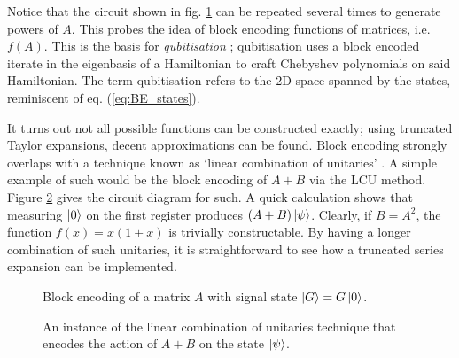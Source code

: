 \documentclass{article}
\begin{document}
Notice that the circuit shown in fig. \ref{fig:BE_A} can be repeated several times to generate powers of $A$. This probes the idea of block encoding functions of matrices, i.e. $f(A)$. This is the basis for \emph{qubitisation} \cite{LC19}; qubitisation uses a block encoded iterate in the eigenbasis of a Hamiltonian to craft Chebyshev polynomials on said Hamiltonian. The term qubitisation refers to the 2D space spanned by the states, reminiscent of eq. (\ref{eq:BE_states}).

It turns out not all possible functions can be constructed exactly; using truncated Taylor expansions, decent approximations can be found. Block encoding strongly overlaps with a technique known as `linear combination of unitaries' \cite{CW12}. A simple example of such would be the block encoding of $A + B$ via the \textsc{LCU} method. Figure \ref{fig:LCU} gives the circuit diagram for such. A quick calculation shows that measuring $\ket{0}$ on the first register produces $(A+B)\ket{\psi}$. Clearly, if $B=A^2$, the function $f(x)=x(1+x)$ is trivially constructable. By having a longer combination of such unitaries, it is straightforward to see how a truncated series expansion can be implemented.

\begin{figure}[h!]
    \centering
    \caption{Block encoding of a matrix $A$ with signal state $\ket{G} = G\ket{0}$.}
    \label{fig:BE_A}
\end{figure}

\begin{figure}[h!]
    \centering
    \caption{An instance of the linear combination of unitaries technique that encodes the action of $A+B$ on the state $\ket{\psi}$.}
    \label{fig:LCU}
\end{figure}
\end{document}
